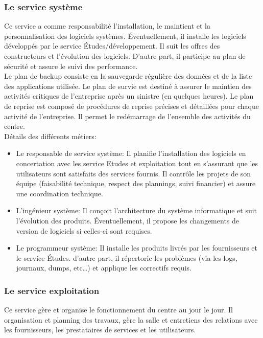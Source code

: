 \documentclass[10pt,a4paper,oneside,titlepage]{report}
\begin{document}
\subsubsection{Le service système}
Ce service a comme responsabilité l'installation, le maintient et la
personnalisation des logiciels systèmes. Éventuellement, il installe les
logiciels développés par le service Études/développement. Il suit les offres
des constructeurs et l'évolution des logiciels. D'autre part, il participe
au plan de sécurité et assure le suivi des performance.\\

Le plan de backup consiste en la sauvegarde régulière des données et de la liste
des applications utilisée. Le plan de survie est destiné à assurer le maintien
des activités critiques de l'entreprise après un sinistre (en quelques heures).
Le plan de reprise est composé de procédures de reprise précises et détaillées
pour chaque activité de l'entreprise. Il permet le redémarrage de l’ensemble des
activités du centre.\\

Détails des différents métiers:
\begin{itemize}
\item Le responsable de service système: Il planifie l’installation des
logiciels en concertation avec les service Etudes et exploitation tout en
s'assurant que les utilisateurs sont satisfaits des services fournis. Il
contrôle les projets de son équipe (faisabilité technique, respect des
plannings, suivi financier) et assure une coordination technique.
\item L'ingénieur système: Il conçoit l’architecture du système informatique et
suit l’évolution des produits. Éventuellement, il propose les changements de
version de logiciels si celles-ci sont requises.
\item Le programmeur système: Il installe les produits livrés par les
fournisseurs et le service Études. d'autre part, il répertorie les problèmes
(via les logs, journaux, dumps, etc\dots) et applique les correctifs requis.
\end{itemize}

\subsubsection{Le service exploitation}
Ce service gère et organise le fonctionnement du centre au jour le jour. Il
organisation et planning des travaux, gère la salle et entretiens des relations
avec les fournisseurs, les prestataires de services et les utilisateurs.\\
\end{document}
